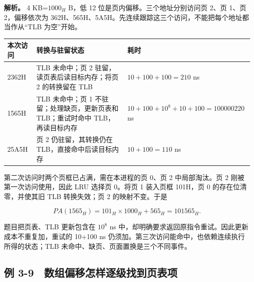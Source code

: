 \textbf{解析。} 4 KB=\(1000_H\) B，低 12 位是页内偏移。三个地址分别访问页 2、页 1、页 2，偏移依次为 362H、565H、5A5H。先连续跟踪这三个访问，不能把每个地址都当作从``TLB 为空''开始。

\begin{wideblock}

\par\medskip\noindent\begin{minipage}{\linewidth}\fontsize{9.3}{12}\selectfont\begin{tabularx}{\linewidth}{@{}YYY@{}}
\toprule\noalign{}
\begin{minipage}[b]{\linewidth}\raggedright
本次访问
\end{minipage} & \begin{minipage}[b]{\linewidth}\raggedright
转换与驻留状态
\end{minipage} & \begin{minipage}[b]{\linewidth}\raggedright
耗时
\end{minipage} \\
\midrule\noalign{}


2362H & TLB 未命中；页 2 驻留，读页表后读目标内存；将页 2 的转换留在 TLB & \(10+100+100=210\) ns \\
1565H & TLB 未命中；页 1 不驻留；处理缺页，更新页表和 TLB；重试时命中 TLB，再读目标内存 & \(10+100+10^8+10+100=100000220\) ns \\
25A5H & 页 2 仍驻留，其转换仍在 TLB，直接命中后读目标内存 & \(10+100=110\) ns \\
\bottomrule\end{tabularx}
\end{minipage}\par\medskip

\end{wideblock}

第二次访问时两个页框已占满，需在本进程的页 0、页 2 中局部淘汰。页 2 刚被第一次访问使用，因此 LRU 选择页 0。将页 1 装入页框 101H，页 0 的存在位清零，并使其旧 TLB 转换失效；页 2 的映射不变。于是

\[PA(1565_H)=101_H\times1000_H+565_H=101565_H.\]

题目把页表、TLB 更新包含在 \(10^8\) ns 中，却明确要求返回原指令重试。因此更新成本不重复加，重试的 10+100 ns 仍须加。第三次访问能命中，也依赖连续执行所得的状态；TLB 未命中、缺页、页面置换是三个不同事件。

\subsection{例 3-9　数组偏移怎样逐级找到页表项}\label{OS03-ex5-9}

